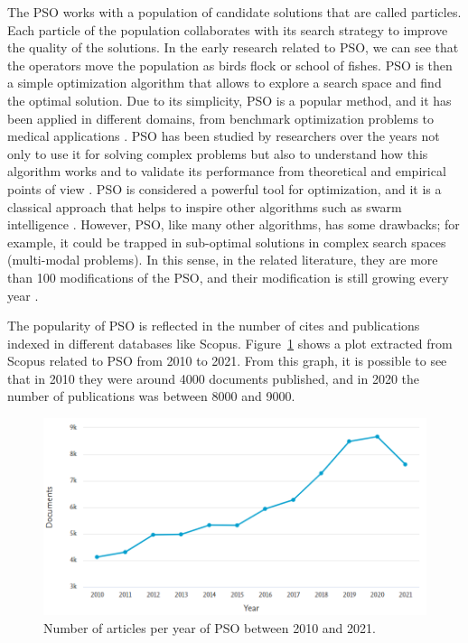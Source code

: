 The PSO works with a population of candidate solutions that are called particles. Each particle of the population collaborates with its search strategy to improve the quality of the solutions. In the early research related to PSO, we can see that the operators move the population as birds flock or school of fishes. PSO is then a simple optimization algorithm that allows to explore a search space and find the optimal solution. Due to its simplicity, PSO is a popular method, and it has been applied in different domains, from benchmark optimization problems to medical applications \cite{shi2001particle}. PSO has been studied by researchers over the years not only to use it for solving complex problems but also to understand how this algorithm works and to validate its performance from theoretical and empirical points of view \cite{shi1999empirical}. PSO is considered a powerful tool for optimization, and it is a classical approach that helps to inspire other algorithms such as swarm intelligence \cite{eberhart2001swarm}. However, PSO, like many other algorithms, has some drawbacks; for example, it could be trapped in sub-optimal solutions in complex search spaces (multi-modal problems). In this sense, in the related literature, they are more than 100 modifications of the PSO, and their modification is still growing every year \cite{imran2013overview}.

The popularity of PSO is reflected in the number of cites and publications indexed in different databases like Scopus. Figure~\ref{fig:PSOyear} shows a plot extracted from Scopus related to PSO from 2010 to 2021. From this graph, it is possible to see that in 2010 they were around 4000 documents published, and in 2020 the number of publications was between 8000 and 9000.

\begin{figure}[h!]
  \centering
  \includegraphics[scale=0.5]{"Part 2 - Search-Based Optimization/Particle Swarm Optimization/Images/PSO Year.PNG"}
  \caption{Number of articles per year of PSO between 2010 and 2021. \label{fig:PSOyear}}
\end{figure}


